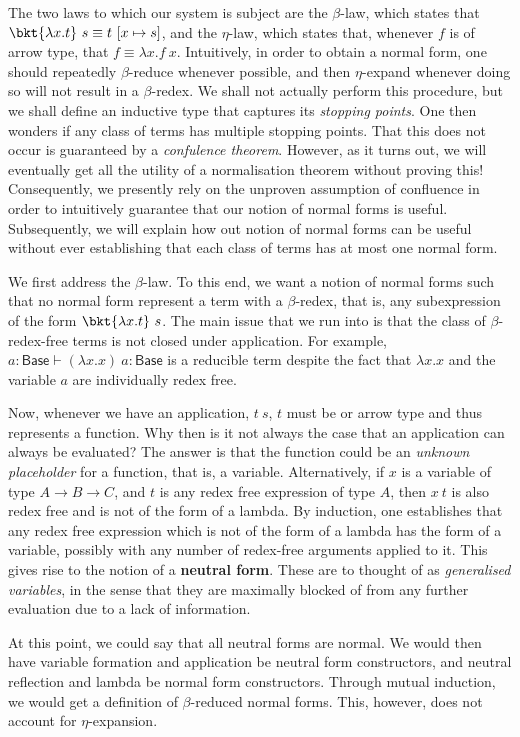 The two laws to which our system is subject are the $\beta$-law, which states
that $\bkt{\lambda x. t}~s \equiv t~[x \mapsto s]$, and the $\eta$-law, which
states that, whenever $f$ is of arrow type, that $f \equiv \lambda x. f~x$.
Intuitively, in order to obtain a normal form, one should repeatedly
$\beta$-reduce whenever possible, and then $\eta$-expand whenever doing so will
not result in a $\beta$-redex. We shall not actually perform this procedure, but
we shall define an inductive type that captures its \emph{stopping points}. One
then wonders if any class of terms has multiple stopping points. That this does
not occur is guaranteed by a \emph{confulence theorem}. However, as it turns
out, we will eventually get all the utility of a normalisation theorem without
proving this! Consequently, we presently rely on the unproven assumption of
confluence in order to intuitively guarantee that our notion of normal forms is
useful. Subsequently, we will explain how out notion of normal forms can be
useful without ever establishing that each class of terms has at most one
normal form.

We first address the $\beta$-law. To this end, we want a notion of normal forms
such that no normal form represent a term with a $\beta$-redex, that is,
any subexpression of the form $\bkt{\lambda x. t}~s$. The main issue that we
run into is that the class of $\beta$-redex-free terms is not closed under
application. For example, $a : \mathsf{Base} \vdash (\lambda x. x)~a :
\mathsf{Base}$ is a reducible term despite the fact that $\lambda x. x$ and the
variable $a$ are individually redex free.

Now, whenever we have an application, $t~s$, $t$ must be or arrow type and thus
represents a function. Why then is it not always the case that an application
can always be evaluated? The answer is that the function could be an
\emph{unknown placeholder} for a function, that is, a variable. Alternatively,
if $x$ is a variable of type $A \to B \to C$, and $t$ is any redex free
expression of type $A$, then $x~t$ is also redex free and is not of the form of
a lambda. By induction, one establishes that any redex free expression which is
not of the form of a lambda has the form of a variable, possibly with any number
of redex-free arguments applied to it. This gives rise to the notion of a
\textbf{neutral form}. These are to thought of as \emph{generalised variables},
in the sense that they are maximally blocked of from any further evaluation due
to a lack of information.

At this point, we could say that all neutral forms are normal. We would then
have variable formation and application be neutral form constructors, and
neutral reflection and lambda be normal form constructors. Through mutual
induction, we would get a definition of $\beta$-reduced normal forms. This,
however, does not account for $\eta$-expansion.

